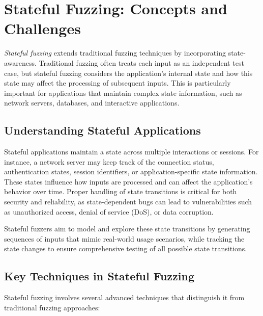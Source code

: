 \section{Stateful Fuzzing: Concepts and Challenges}
\textit{Stateful fuzzing} extends traditional fuzzing techniques by incorporating state-awareness. Traditional fuzzing often treats each input as an independent test case, but stateful fuzzing considers the application's internal state and how this state may affect the processing of subsequent inputs. This is particularly important for applications that maintain complex state information, such as network servers, databases, and interactive applications.

\subsection{Understanding Stateful Applications}
Stateful applications maintain a state across multiple interactions or sessions. For instance, a network server may keep track of the connection status, authentication states, session identifiers, or application-specific state information. These states influence how inputs are processed and can affect the application's behavior over time. Proper handling of state transitions is critical for both security and reliability, as state-dependent bugs can lead to vulnerabilities such as unauthorized access, denial of service (DoS), or data corruption.

Stateful fuzzers aim to model and explore these state transitions by generating sequences of inputs that mimic real-world usage scenarios, while tracking the state changes to ensure comprehensive testing of all possible state transitions.

\subsection{Key Techniques in Stateful Fuzzing}
Stateful fuzzing involves several advanced techniques that distinguish it from traditional fuzzing approaches:

